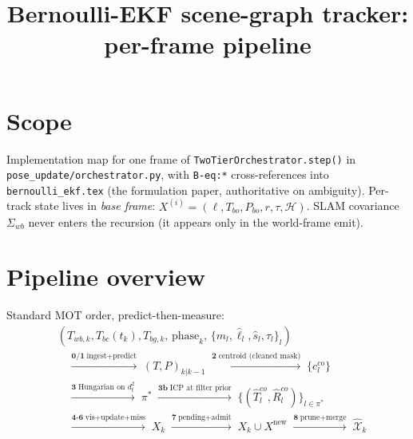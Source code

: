 \documentclass[11pt]{article}
\title{Bernoulli-EKF scene-graph tracker: per-frame pipeline}
\author{}\date{}
\newcommand{\code}[1]{\texttt{\small #1}}
\begin{document}
\maketitle

\section{Scope}
Implementation map for one frame of \code{TwoTierOrchestrator.step()} in
\code{pose\_update/orchestrator.py}, with \code{B-eq:*} cross-references
into \code{bernoulli\_ekf.tex} (the formulation paper, authoritative on
ambiguity). Per-track state lives in \emph{base frame}: $X^{(i)}=
(\ell,T_{bo},P_{bo},r,\tau,\mathcal H)$. SLAM covariance $\Sigma_{wb}$
never enters the recursion (it appears only in the world-frame emit).

\section{Pipeline overview}

Standard MOT order, predict-then-measure:
\begin{equation*}
\begin{aligned}
   & (T_{wb,k},T_{bc}(t_k),T_{bg,k},\,\text{phase}_k,\,
      \{m_l,\hat\ell_l,\hat s_l,\tau_l\}_l) \\
   &\quad\xrightarrow{\textbf{0/1}\;\text{ingest+predict}}\;
      (T,P)_{k|k-1}
   \;\xrightarrow{\textbf{2}\;\text{centroid (cleaned mask)}}\;
      \{c^{co}_l\} \\
   &\quad\xrightarrow{\textbf{3}\;\text{Hungarian on }d^2_t}\;
      \pi^*
   \;\xrightarrow{\textbf{3b}\;\text{ICP at filter prior}}\;
      \{(\hat T^{co}_l,\hat R^{co}_l)\}_{l\in\pi^*} \\
   &\quad\xrightarrow{\textbf{4-6}\;\text{vis+update+miss}}\;
      X_k
   \;\xrightarrow{\textbf{7}\;\text{pending+admit}}\;
      X_k\cup X^{\text{new}}
   \;\xrightarrow{\textbf{8}\;\text{prune+merge}}\;
      \widehat{\mathcal X}_k
\end{aligned}
\end{equation*}
\end{document}
